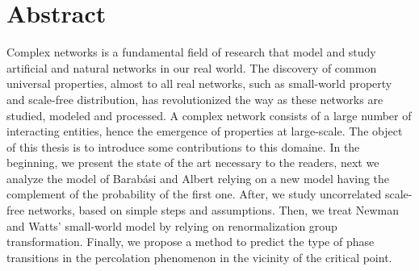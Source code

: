 %
%
\chapter*{Abstract}
Complex networks is a fundamental field of research that model and study artificial and natural networks in our real world. The discovery of common universal properties, almost to all real networks, such as small-world property and scale-free distribution, has revolutionized the way as these networks are studied, modeled and processed.
 A complex network consists of a large number of interacting entities, hence the emergence of properties at large-scale. The object of this thesis is to introduce some contributions to this domaine. In the beginning, we present the state of the art necessary to the readers, next we analyze the model of Barabási and Albert relying on a new model having the complement of the probability of the first one. After, we study uncorrelated scale-free networks, based on simple steps and assumptions. Then, we treat Newman and Watts' small-world model by relying on renormalization group transformation. 
 Finally, we propose a method to predict the type of phase transitions in the percolation phenomenon in the vicinity of the critical point.